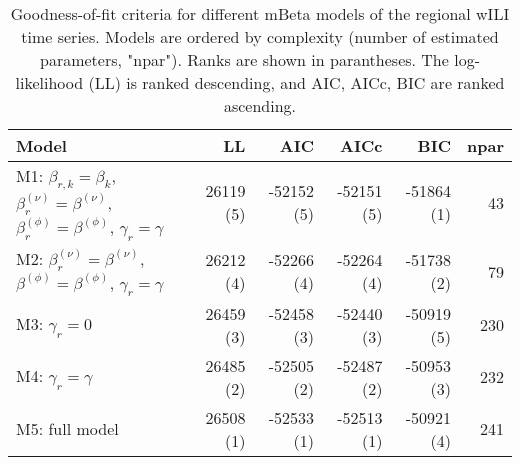 \begin{table}[ht]
\centering
\begingroup\fontsize{9pt}{10pt}\selectfont
\begin{tabular}{l|rrrrr}
  \hline
Model & LL & AIC & AICc & BIC & npar \\ 
  \hline
M1: $\beta_{r,k} = \beta_{k}$, $\beta_{r}^{(\nu)} = \beta^{(\nu)}$, $\beta_{r}^{(\phi)} = \beta^{(\phi)}$, $\gamma_r = \gamma$ & 26119 (5) & -52152 (5) & -52151 (5) & -51864 (1) & 43 \\ 
  M2: $\beta_{r}^{(\nu)} = \beta^{(\nu)}$, $\beta^{(\phi)} = \beta^{(\phi)}$, $\gamma_r = \gamma$ & 26212 (4) & -52266 (4) & -52264 (4) & -51738 (2) & 79 \\ 
  M3: $\gamma_r = 0$ & 26459 (3) & -52458 (3) & -52440 (3) & -50919 (5) & 230 \\ 
  M4: $\gamma_r = \gamma$ & 26485 (2) & -52505 (2) & -52487 (2) & -50953 (3) & 232 \\ 
  M5: full model & 26508 (1) & -52533 (1) & -52513 (1) & -50921 (4) & 241 \\ 
   \hline
\end{tabular}
\endgroup
\caption{Goodness-of-fit criteria for different mBeta models of the regional wILI time series.
             Models are ordered by complexity (number of estimated parameters, "npar").
             Ranks are shown in parantheses.
             The log-likelihood (LL) is ranked descending,
             and AIC, AICc, BIC are ranked ascending.} 
\label{tab:mBetafit}
\end{table}
